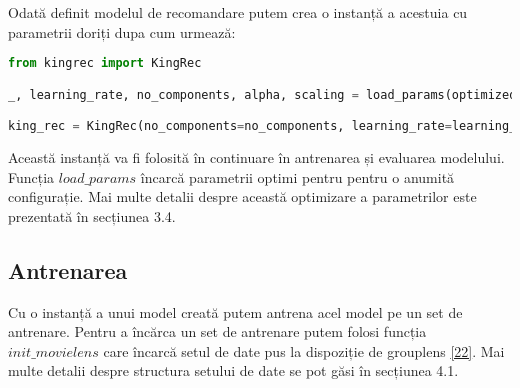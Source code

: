 Odată definit modelul de recomandare putem crea o instanță a acestuia cu parametrii doriți dupa cum urmează:
\begin{lstlisting}[language=Python, caption=Instanțierea unui model]
from kingrec import KingRec

_, learning_rate, no_components, alpha, scaling = load_params(optimized_for='auc_clusters')

king_rec = KingRec(no_components=no_components, learning_rate=learning_rate, alpha=alpha, scale=scaling, loss='warp')
\end{lstlisting}
Această instanță va fi folosită în continuare în antrenarea și evaluarea modelului.
Funcția $load\_params$ încarcă parametrii optimi pentru pentru o anumită configurație. Mai multe detalii despre această optimizare a parametrilor este prezentată în secțiunea 3.4.

\subsection{Antrenarea}
Cu o instanță a unui model creată putem antrena acel model pe un set de antrenare. Pentru a încărca un set de antrenare putem folosi funcția $init\_movielens$ care încarcă setul de date pus la dispoziție de grouplens \hyperlink{movielens}{[22]}. Mai multe detalii despre structura setului de date se pot găsi în secțiunea 4.1.

